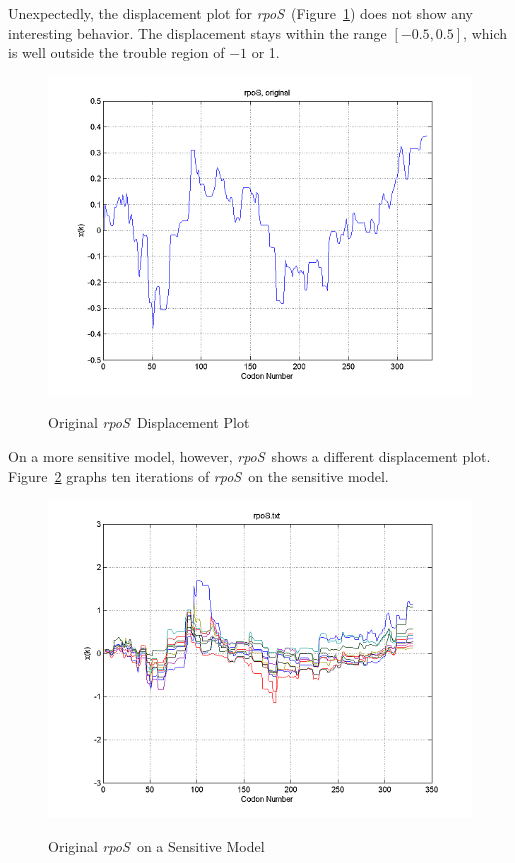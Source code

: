 \documentclass[10pt,twocolumn]{article}
\newcommand{\rpoS}{\emph{rpoS}}
\begin{document}
Unexpectedly, the displacement plot for \rpoS\ (Figure~\ref{rpos:disp}) does not show any interesting behavior.
The displacement stays within the range $[-0.5,0.5]$, which is well outside the trouble region of $-1$ or 1.

\begin{figure}[htp]
    \centering
    \caption{Original \rpoS\ Displacement Plot}
    \label{rpos:disp}
    {\includegraphics[scale=0.8]{rpoS.png}}
\end{figure}

On a more sensitive model, however, \rpoS\ shows a different displacement plot.  
Figure~\ref{rpos:sensdisp} graphs ten iterations of \rpoS\ on the sensitive model.

\begin{figure}[htp]
    \centering
    \caption{Original \rpoS\ on a Sensitive Model}
    \label{rpos:sensdisp}
    {\includegraphics[scale=0.8]{rpoS_sens.png}}
\end{figure}
\end{document}
